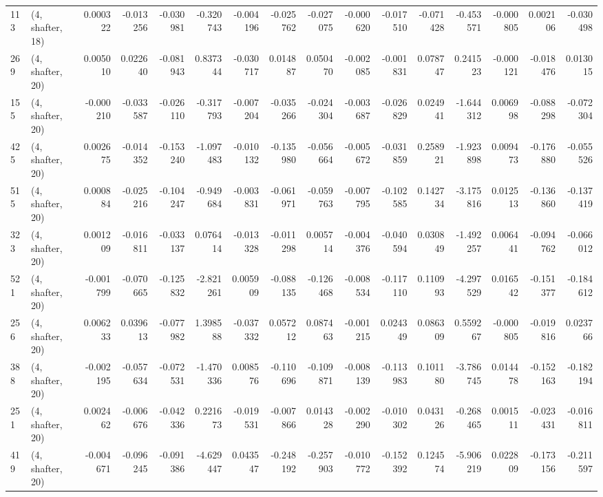 \begin{tabular}{llrrrrrrrrrrrrrr}
113 &  (4, shafter, 18) &   0.000322 & -0.013256 & -0.030981 &   -0.320743 & -0.004196 &  -0.025762 &  -0.027075 & -0.000620 & -0.017510 & -0.071428 &   -0.453571 & -0.000805 &   0.002106 &  -0.030498 \\
269 &  (4, shafter, 20) &   0.005010 &  0.022640 & -0.081943 &    0.837344 & -0.030717 &   0.014887 &   0.050470 & -0.002085 & -0.001831 &  0.078747 &    0.241523 & -0.000121 &  -0.018476 &   0.013015 \\
155 &  (4, shafter, 20) &  -0.000210 & -0.033587 & -0.026110 &   -0.317793 & -0.007204 &  -0.035266 &  -0.024304 & -0.003687 & -0.026829 &  0.024941 &   -1.644312 &  0.006998 &  -0.088298 &  -0.072304 \\
425 &  (4, shafter, 20) &   0.002675 & -0.014352 & -0.153240 &   -1.097483 & -0.010132 &  -0.135980 &  -0.056664 & -0.005672 & -0.031859 &  0.258921 &   -1.923898 &  0.009473 &  -0.176880 &  -0.055526 \\
515 &  (4, shafter, 20) &   0.000884 & -0.025216 & -0.104247 &   -0.949684 & -0.003831 &  -0.061971 &  -0.059763 & -0.007795 & -0.102585 &  0.142734 &   -3.175816 &  0.012513 &  -0.136860 &  -0.137419 \\
323 &  (4, shafter, 20) &   0.001209 & -0.016811 & -0.033137 &    0.076414 & -0.013328 &  -0.011298 &   0.005714 & -0.004376 & -0.040594 &  0.030849 &   -1.492257 &  0.006441 &  -0.094762 &  -0.066012 \\
521 &  (4, shafter, 20) &  -0.001799 & -0.070665 & -0.125832 &   -2.821261 &  0.005909 &  -0.088135 &  -0.126468 & -0.008534 & -0.117110 &  0.110993 &   -4.297529 &  0.016542 &  -0.151377 &  -0.184612 \\
256 &  (4, shafter, 20) &   0.006233 &  0.039613 & -0.077982 &    1.398588 & -0.037332 &   0.057212 &   0.087463 & -0.001215 &  0.024349 &  0.086309 &    0.559267 & -0.000805 &  -0.019816 &   0.023766 \\
388 &  (4, shafter, 20) &  -0.002195 & -0.057634 & -0.072531 &   -1.470336 &  0.008576 &  -0.110696 &  -0.109871 & -0.008139 & -0.113983 &  0.101180 &   -3.786745 &  0.014478 &  -0.152163 &  -0.182194 \\
251 &  (4, shafter, 20) &   0.002462 & -0.006676 & -0.042336 &    0.221673 & -0.019531 &  -0.007866 &   0.014328 & -0.002290 & -0.010302 &  0.043126 &   -0.268465 &  0.001511 &  -0.023431 &  -0.016811 \\
419 &  (4, shafter, 20) &  -0.004671 & -0.096245 & -0.091386 &   -4.629447 &  0.043547 &  -0.248192 &  -0.257903 & -0.010772 & -0.152392 &  0.124574 &   -5.906219 &  0.022809 &  -0.173156 &  -0.211597 \\

\end{tabular}
